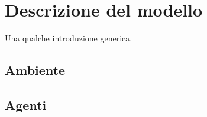\chapter{Descrizione del modello}
\label{chap:modeldesc}
Una qualche introduzione generica.
\section{Ambiente}
\label{sec:environment}

\section{Agenti}
\label{sec:agents}
